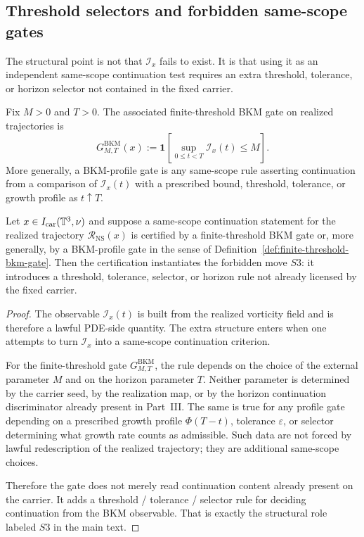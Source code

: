 \subsection{Threshold selectors and forbidden same-scope gates}
The structural point is not that $\mathcal I_x$ fails to exist. It is that using it as an independent
same-scope continuation test requires an extra threshold, tolerance, or horizon selector not contained
in the fixed carrier.

\begin{definition}\label{def:finite-threshold-bkm-gate}
Fix $M>0$ and $T>0$. The associated finite-threshold BKM gate on realized trajectories is
\[
G^{\mathrm{BKM}}_{M,T}(x):=\mathbf 1\!\left[\sup_{0\le t<T}\mathcal I_x(t)\le M\right].
\]
More generally, a BKM-profile gate is any same-scope rule asserting continuation from a comparison of
$\mathcal I_x(t)$ with a prescribed bound, threshold, tolerance, or growth profile as $t\uparrow T$.
\end{definition}

\begin{proposition}\label{prop:bkm-forces-s3}
Let $x\in I_{\mathrm{car}}(\mathbb{T}^3,\nu)$ and suppose a same-scope continuation statement for the realized
trajectory $\mathcal R_{\mathrm{NS}}(x)$ is certified by a finite-threshold BKM gate or, more generally, by a
BKM-profile gate in the sense of Definition~\ref{def:finite-threshold-bkm-gate}. Then the certification
instantiates the forbidden move $S3$: it introduces a threshold, tolerance, selector, or horizon rule
not already licensed by the fixed carrier.
\end{proposition}

\begin{proof}
The observable $\mathcal I_x(t)$ is built from the realized vorticity field and is therefore a lawful
PDE-side quantity. The extra structure enters when one attempts to turn $\mathcal I_x$ into a
same-scope continuation criterion.

For the finite-threshold gate $G^{\mathrm{BKM}}_{M,T}$, the rule depends on the choice of the external
parameter $M$ and on the horizon parameter $T$. Neither parameter is determined by the carrier seed,
by the realization map, or by the horizon continuation discriminator already present in Part~III. The
same is true for any profile gate depending on a prescribed growth profile $\Phi(T-t)$, tolerance
$\varepsilon$, or selector determining what growth rate counts as admissible. Such data are not forced by
lawful redescription of the realized trajectory; they are additional same-scope choices.

Therefore the gate does not merely read continuation content already present on the carrier. It adds a
threshold / tolerance / selector rule for deciding continuation from the BKM observable. That is exactly
the structural role labeled $S3$ in the main text.
\end{proof}

